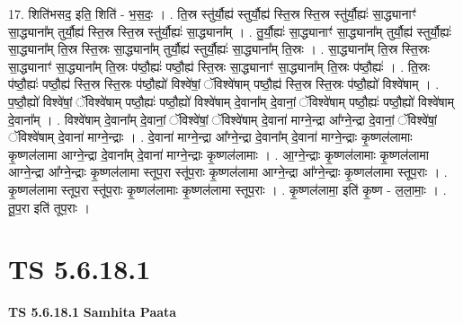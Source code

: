\documentclass[17pt]{extarticle}
\begin{document}
17. शिति॑भसद॒ इति॒ शिति॑ - भ॒स॒दः॒ । . ति॒स्र स्तु॑र्यौ॒ह्य॑ स्तुर्यौ॒ह्य॑ स्ति॒स्र स्ति॒स्र स्तु॑र्यौ॒ह्यः॑ सा॒द्ध्यानाꣳ॑ सा॒द्ध्याना᳚म् तुर्यौ॒ह्य॑ स्ति॒स्र स्ति॒स्र स्तु॑र्यौ॒ह्यः॑ सा॒द्ध्याना᳚म् । . तु॒र्यौ॒ह्यः॑ सा॒द्ध्यानाꣳ॑ सा॒द्ध्याना᳚म् तुर्यौ॒ह्य॑ स्तुर्यौ॒ह्यः॑ सा॒द्ध्याना᳚म् ति॒स्र स्ति॒स्रः सा॒द्ध्याना᳚म् तुर्यौ॒ह्य॑ स्तुर्यौ॒ह्यः॑ सा॒द्ध्याना᳚म् ति॒स्रः । . सा॒द्ध्याना᳚म् ति॒स्र स्ति॒स्रः सा॒द्ध्यानाꣳ॑ सा॒द्ध्याना᳚म् ति॒स्रः प॑ष्ठौ॒ह्यः॑ पष्ठौ॒ह्य॑ स्ति॒स्रः सा॒द्ध्यानाꣳ॑ सा॒द्ध्याना᳚म् ति॒स्रः प॑ष्ठौ॒ह्यः॑ । . ति॒स्रः प॑ष्ठौ॒ह्यः॑ पष्ठौ॒ह्य॑ स्ति॒स्र स्ति॒स्रः प॑ष्ठौ॒ह्यो॑ विश्वे॑षां॒ ॅविश्वे॑षाम् पष्ठौ॒ह्य॑ स्ति॒स्र स्ति॒स्रः प॑ष्ठौ॒ह्यो॑ विश्वे॑षाम् । . प॒ष्ठौ॒ह्यो॑ विश्वे॑षां॒ ॅविश्वे॑षाम् पष्ठौ॒ह्यः॑ पष्ठौ॒ह्यो॑ विश्वे॑षाम् दे॒वाना᳚म् दे॒वानां॒ ॅविश्वे॑षाम् पष्ठौ॒ह्यः॑ पष्ठौ॒ह्यो॑ विश्वे॑षाम् दे॒वाना᳚म् । . विश्वे॑षाम् दे॒वाना᳚म् दे॒वानां॒ ॅविश्वे॑षां॒ ॅविश्वे॑षाम् दे॒वाना॑ माग्ने॒न्द्रा आ᳚ग्ने॒न्द्रा दे॒वानां॒ ॅविश्वे॑षां॒ ॅविश्वे॑षाम् दे॒वाना॑ माग्ने॒न्द्राः । . दे॒वाना॑ माग्ने॒न्द्रा आ᳚ग्ने॒न्द्रा दे॒वाना᳚म् दे॒वाना॑ माग्ने॒न्द्राः कृ॒ष्णल॑लामाः कृ॒ष्णल॑लामा आग्ने॒न्द्रा दे॒वाना᳚म् दे॒वाना॑ माग्ने॒न्द्राः कृ॒ष्णल॑लामाः । . आ॒ग्ने॒न्द्राः कृ॒ष्णल॑लामाः कृ॒ष्णल॑लामा आग्ने॒न्द्रा आ᳚ग्ने॒न्द्राः कृ॒ष्णल॑लामा स्तूप॒रा स्तू॑प॒राः कृ॒ष्णल॑लामा आग्ने॒न्द्रा आ᳚ग्ने॒न्द्राः कृ॒ष्णल॑लामा स्तूप॒राः । . कृ॒ष्णल॑लामा स्तूप॒रा स्तू॑प॒राः कृ॒ष्णल॑लामाः कृ॒ष्णल॑लामा स्तूप॒राः । . कृ॒ष्णल॑लामा॒ इति॑ कृ॒ष्ण - ल॒ला॒माः॒ । . तू॒प॒रा इति॑ तूप॒राः । \newline
\pagebreak
{}

\section{ TS 5.6.18.1 }

\textbf{TS 5.6.18.1 } \newline
\textbf{Samhita Paata} \newline
\end{document}
